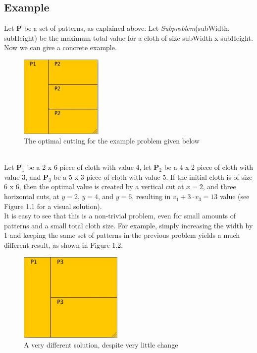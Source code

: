 \documentclass[paper=a4, fontsize=11pt]{scrartcl} %
\numberwithin{equation}{section} %
\numberwithin{figure}{section} %
\numberwithin{table}{section} %
\begin{document}
\subsection{Example}
Let $\mathbf{P}$ be a set of patterns, as explained above. Let \emph{Subproblem}(subWidth, subHeight) be the maximum total value for a cloth of size subWidth x subHeight. Now we can give a concrete example.\\
\begin{figure}[ht!]
\centering
\includegraphics[width=40mm]{Figure_1.jpg}
\caption{The optimal cutting for the example problem given below}
\label{overflow}
\end{figure}
\\Let $\mathbf{P}_1$ be a 2 x 6 piece of cloth with value 4, let $\mathbf{P}_2$ be a 4 x 2 piece of cloth with value 3, and $\mathbf{P}_3$ be a 5 x 3 piece of cloth with value 5. If the initial cloth is of size 6 x 6, then the optimal value is created by a vertical cut at $x = 2$, and three horizontal cuts, at $y = 2$, $y = 4$, and $y = 6$, resulting in $v_1 + 3 \cdot v_3 = 13$ value (see Figure 1.1 for a visual solution).\\
\indent It is easy to see that this is a non-trivial problem, even for small amounts of patterns and a small total cloth size. For example, simply increasing the width by 1 and keeping the same set of patterns in the previous problem yields a much different result, as shown in Figure 1.2.
\begin{figure}[ht!]
\centering
\includegraphics[width=50mm]{Figure_2.jpg}
\caption{A very different solution, despite very little change}
\label{overflow}
\end{figure}
\end{document}
